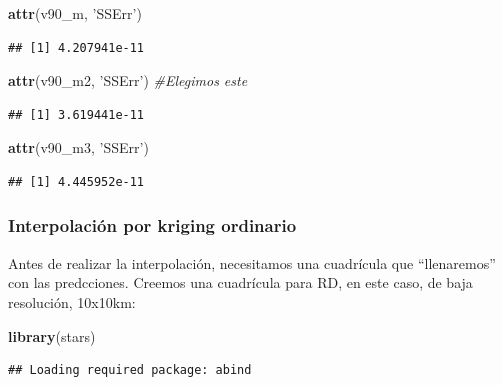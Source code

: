 \documentclass[11pt,]{article}
\newenvironment{Shaded}{\begin{snugshade}}{\end{snugshade}}
\newcommand{\KeywordTok}[1]{\textcolor[rgb]{0.13,0.29,0.53}{\textbf{#1}}}
\newcommand{\DataTypeTok}[1]{\textcolor[rgb]{0.13,0.29,0.53}{#1}}
\newcommand{\DecValTok}[1]{\textcolor[rgb]{0.00,0.00,0.81}{#1}}
\newcommand{\StringTok}[1]{\textcolor[rgb]{0.31,0.60,0.02}{#1}}
\newcommand{\CommentTok}[1]{\textcolor[rgb]{0.56,0.35,0.01}{\textit{#1}}}
\newcommand{\OperatorTok}[1]{\textcolor[rgb]{0.81,0.36,0.00}{\textbf{#1}}}
\newcommand{\NormalTok}[1]{#1}
\begin{document}
\begin{Shaded}
\begin{Highlighting}[]
\KeywordTok{attr}\NormalTok{(v90_m, }\StringTok{'SSErr'}\NormalTok{)}
\end{Highlighting}
\end{Shaded}

\begin{verbatim}
## [1] 4.207941e-11
\end{verbatim}

\begin{Shaded}
\begin{Highlighting}[]
\KeywordTok{attr}\NormalTok{(v90_m2, }\StringTok{'SSErr'}\NormalTok{) }\CommentTok{#Elegimos este}
\end{Highlighting}
\end{Shaded}

\begin{verbatim}
## [1] 3.619441e-11
\end{verbatim}

\begin{Shaded}
\begin{Highlighting}[]
\KeywordTok{attr}\NormalTok{(v90_m3, }\StringTok{'SSErr'}\NormalTok{)}
\end{Highlighting}
\end{Shaded}

\begin{verbatim}
## [1] 4.445952e-11
\end{verbatim}

\subsubsection{Interpolación por kriging
ordinario}\label{interpolaciuxf3n-por-kriging-ordinario}

Antes de realizar la interpolación, necesitamos una cuadrícula que
``llenaremos'' con las predcciones. Creemos una cuadrícula para RD, en
este caso, de baja resolución, 10x10km:

\begin{Shaded}
\begin{Highlighting}[]
\KeywordTok{library}\NormalTok{(stars)}
\end{Highlighting}
\end{Shaded}

\begin{verbatim}
## Loading required package: abind
\end{verbatim}

\begin{Shaded}
\end{Shaded}
\end{document}
